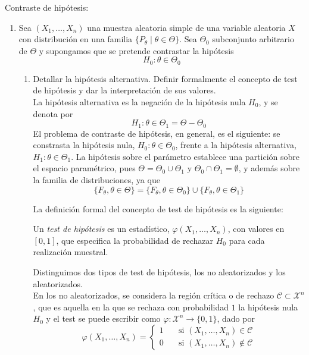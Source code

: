 \documentclass[12pt]{article}
\newcommand{\X}{\mathcal{X}}
\begin{document}
    \begin{ejercicio}[2,4 puntos]
        Contraste de hipótesis:

        \begin{enumerate}
            \item[a)] Sea $(X_1,\dots,X_n)$ una muestra aleatoria simple de una variable aleatoria $X$
            con distribución en una familia $\{P_\theta \mid \theta \in \Theta\}$. Sea $\Theta_0$
            subconjunto arbitrario de $\Theta$ y supongamos que se pretende contrastar la hipótesis
            $$
            H_0: \theta \in \Theta_0
            $$

            \begin{enumerate}
                \item[a1)] Detallar la hipótesis alternativa. Definir formalmente el concepto de test de
                hipótesis y dar la interpretación de sus valores. \\

                La hipótesis alternativa es la negación de la hipótesis nula $H_0$, y se denota por
                $$H_1: \theta \in \Theta_1 = \Theta - \Theta_0$$ El problema de contraste de hipótesis,
                en general, es el siguiente: se constrasta la hipótesis nula, $H_0: \theta \in \Theta_0$,
                frente a la hipótesis alternativa, $H_1: \theta \in \Theta_1$. La hipótesis sobre el parámetro
                establece una partición sobre el espacio paramétrico, pues $\Theta = \Theta_0 \cup \Theta_1$
                y $\Theta_0 \cap \Theta_1 = \emptyset$, y además sobre la familia de distribuciones, ya que
                $$\{F_\theta, \theta \in \Theta\} = \{F_\theta, \theta \in \Theta_0\} \cup 
                \{F_\theta, \theta \in \Theta_1\}$$

                La definición formal del concepto de test de hipótesis es la siguiente:

                \begin{definicion}
                    Un \textit{test de hipótesis} es un estadístico, $\varphi(X_1, \ldots, X_n)$, con valores en 
                    $[0,1]$, que especifica la probabilidad de rechazar $H_0$ para cada realización muestral.
                \end{definicion}

                Distinguimos dos tipos de test de hipótesis, los no aleatorizados y los aleatorizados. \\

                En los no aleatorizados, se considera la región crítica o de rechazo $\mathcal{C} \subset \X^n$,
                que es aquella en la que se rechaza con probabilidad $1$ la hipótesis nula $H_0$ y
                el test se puede escribir como $\varphi : \X^n \to \{0,1\}$, dado por 
                $$\varphi(X_1, \ldots, X_n) = {\begin{cases}
                    1 \quad &\text{si } (X_1, \ldots, X_n) \in \mathcal{C} \\
                    0 \quad &\text{si } (X_1, \ldots, X_n) \notin \mathcal{C}
                \end{cases}}$$


\end{enumerate}
\end{enumerate}
\end{ejercicio}
\end{document}
